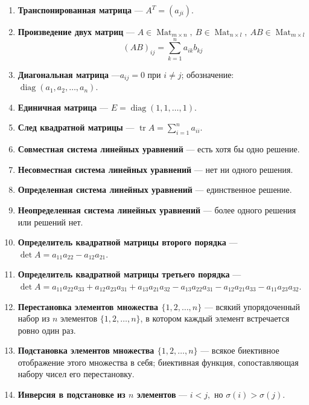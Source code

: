 \documentclass[a4paper, 12pt]{article}
\DeclareMathOperator{\Mat}{Mat}
\DeclareMathOperator{\Tr}{tr}
\DeclareMathOperator{\diag}{diag}
\begin{document}
\begin{enumerate}
\item \textbf{Транспонированная матрица} — $A^T = (a_{ji})$.

\item \textbf{Произведение двух матриц} — $A \in \Mat_{m\times n},\ B \in \Mat_{n \times l},\ AB \in \Mat_{m \times l}$ 
$$
(AB)_{ij}= \sum_{k = 1}^{n}a_{ik}b_{kj}
$$

\item \textbf{Диагональная матрица} —$a_{ij} = 0$ при $i \ne j$; обозначение: $\diag(a_1, a_2, \ldots, a_n)$. 

\item \textbf{Единичная матрица} — $E = \diag(1, 1, \ldots, 1)$.

\item \textbf{След квадратной матрицы} — $\Tr A = \sum\limits_{i = 1}^{n} a_{ii}$.

\item \textbf{Совместная система линейных уравнений} — есть хотя бы одно решение.

\item \textbf{Несовместная система линейных уравнений} — нет ни одного решения.

\item \textbf{Определенная система линейных уравнений} — единственное решение.

\item \textbf{Неопределенная система линейных уравнений} — более одного решения или решений нет.

\item \textbf{Определитель квадратной матрицы второго порядка} — $\det{A} = a_{11}a_{22} - a_{12} a_{21}$.

\item \textbf{Определитель квадратной матрицы третьего порядка} — $\det{A} = a_{11} a_{22} a_{33} + a_{12} a_{23} a_{31} + a_{13} a_{21} a_{32} - a_{13} a_{22} a_{31} - a_{12} a_{21} a_{33} - a_{11} a_{23} a_{32}$.

\item \textbf{Перестановка элементов множества $\{1,2,\dots,n\}$} — всякий упорядоченный набор из $n$ элементов $\{1, 2, \dots, n\}$, в котором каждый элемент встречается ровно один раз.

\item \textbf{Подстановка элементов множества $\{1, 2, \dots, n\}$} — всякое биективное отображение этого множества в себя; биективная функция, сопоставляющая набору чисел его перестановку.

\item \textbf{Инверсия в подстановке из $n$ элементов} — $i < j,$ но $\sigma(i) > \sigma(j)$.


\end{enumerate}
\end{document}
